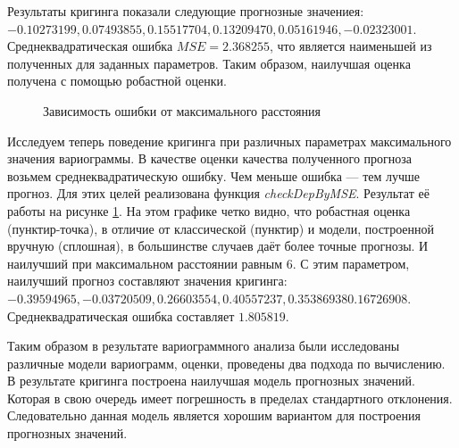 Результаты кригинга показали следующие прогнозные значениея: $-0.10273199, 0.07493855, 0.15517704, 0.13209470, 0.05161946, -0.02323001$. Среднеквадратическая ошибка $MSE=2.368255$, что является наименьшей из полученных для заданных параметров. Таким образом, наилучшая оценка получена с помощью робастной оценки.

\begin{figure}[H]
\caption{Зависимость ошибки от максимального расстояния}
\label{img:check-dep}
\end{figure}

Исследуем теперь поведение кригинга при различных параметрах максимального значения вариограммы. В качестве оценки качества полученного прогноза возьмем среднеквадратическую ошибку. Чем меньше ошибка --- тем лучше прогноз. Для этих целей реализована функция \textit{checkDepByMSE}. Результат её работы на рисунке \ref{img:check-dep}. На этом графике четко видно, что робастная оценка (пунктир-точка), в отличие от классической (пунктир) и модели, построенной вручную (сплошная), в большинстве случаев даёт более точные прогнозы. И наилучший при максимальном расстоянии равным $6$. С этим параметром, наилучший прогноз составляют значения кригинга: $-0.39594965, -0.03720509,  0.26603554,  0.40557237,  0.35386938  0.16726908$. Среднеквадратическая ошибка составляет $1.805819$. 



Таким образом в результате вариограммного анализа были исследованы различные модели вариограмм, оценки, проведены два подхода по вычислению. В результате кригинга построена наилучшая модель прогнозных значений. Которая в свою очередь имеет погрешность в пределах стандартного отклонения. Следовательно данная модель является хорошим вариантом для построения прогнозных значений.
